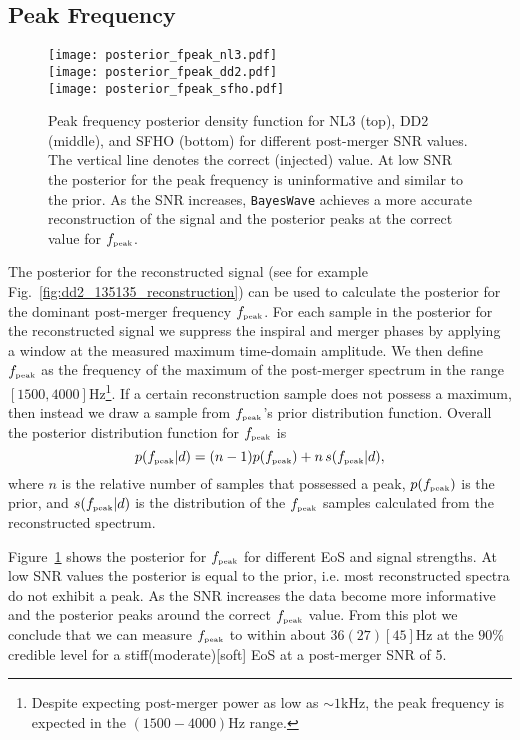 \documentclass[aps,prd,amsmath,floats,floatfix, twocolumn,
superscriptaddress,nofootinbib,showpacs]{revtex4-1}
\newcommand{\peak}{{\mbox{\tiny peak}}}
\begin{document}
\subsection{Peak Frequency}
\label{sec:fpeak}
%
\begin{figure}[h!]
\texttt{[image: posterior\_fpeak\_nl3.pdf]}\\
\texttt{[image: posterior\_fpeak\_dd2.pdf]}\\
\texttt{[image: posterior\_fpeak\_sfho.pdf]}
\caption{\label{fig:fpeakposteriors}Peak frequency posterior density function for NL3 (top), DD2 (middle), and SFHO (bottom) for different post-merger SNR values. The vertical line denotes the correct (injected) value. At low SNR the posterior for the peak frequency is uninformative and similar to the prior. As the SNR increases, {\tt BayesWave} achieves a more accurate reconstruction of the signal and the posterior peaks at the correct value for $f_{\peak}$.}
\end{figure}
%

The posterior for the reconstructed signal (see for example Fig.~\ref{fig:dd2_135135_reconstruction}) can be used to calculate the posterior for the dominant post-merger frequency $f_{\peak}$. For each sample in the posterior for the reconstructed signal we suppress the inspiral and merger phases by applying a window at the measured maximum time-domain amplitude.  We then define $f_{\peak}$ as the frequency of the maximum of the post-merger spectrum in the range $[1500,4000]$Hz\footnote{Despite expecting post-merger power as low as $\sim1$kHz, the peak frequency is expected in the $(1500-4000)$Hz range.}. If a certain reconstruction sample does not possess a maximum, then instead we draw a sample from $f_{\peak}$'s prior distribution function. Overall the posterior distribution function for $f_{\peak}$ is
%
\begin{equation}
p(f_{\peak}|d)=(n-1)p(f_{\peak}) + n \,s(f_{\peak}|d)\label{posteriordefinition},
\end{equation}
%
where $n$ is the relative number of samples that possessed a peak, $p(f_{\peak})$ is the prior, and $s(f_{\peak}|d)$ is the distribution of the $f_{\peak}$ samples calculated from the reconstructed spectrum.

Figure~\ref{fig:fpeakposteriors} shows the posterior for $f_{\peak}$ for different EoS and signal strengths. At low SNR values the posterior is equal to the prior, i.e. most reconstructed spectra do not exhibit a peak. As the SNR increases the data become more informative and the posterior peaks around the correct $f_{\peak}$ value. From this plot we conclude that we can measure $f_{\peak}$ to within about $36(27)[45]$Hz at the $90\%$ credible level for a stiff(moderate)[soft] EoS at a post-merger SNR of 5.
\end{document}
